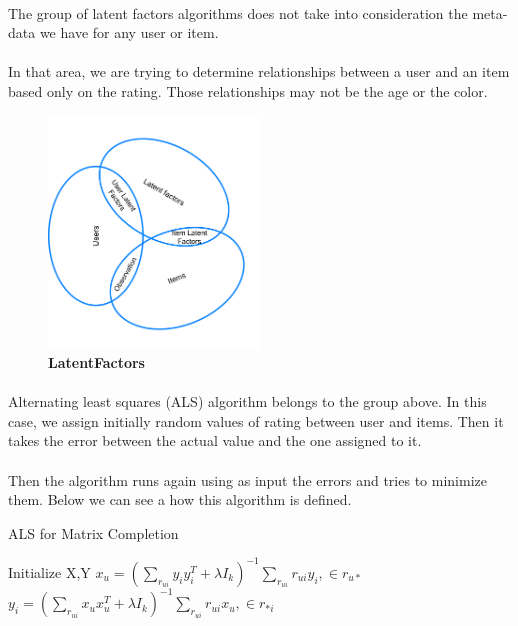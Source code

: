\paragraph{} The group of latent factors algorithms does not take into consideration the meta-data we have for any user or item. 
\paragraph{} In that area, we are trying to determine relationships between a user and an item based only on the rating. Those relationships may not be the age or the color.

\begin{figure}[h]
	\centering
	\includegraphics[width=0.5\textwidth]{../images/LatentFactors.png}
	\caption{\bfseries LatentFactors}
	\label{LatentFactors}
\end{figure}


\paragraph{} Alternating least squares (ALS) algorithm belongs to the group above. In this case, we assign initially random values of rating between user and items. Then it takes the error between the actual value and the one assigned to it. 

\paragraph{}Then the algorithm runs again using as input the errors and tries to minimize them. Below we can see a how this algorithm is defined. \\

\begin{algorithm}
	\caption{ALS for Matrix Completion}\label{ALS}
	\begin{algorithmic}[1]
		\State Initialize X,Y
		\Repeat
		\State $x_{u} = (\sum_{r_{ui}}y_{i}y_{i}^{T} + \lambda I_k)^{-1} \sum_{r_{ui}}r_{ui}y_{i} ,\in r_{u*}$
		\EndFor
		\State $y_{i} = (\sum_{r_{ui}}x_{u}x_{u}^{T} + \lambda I_k)^{-1} \sum_{r_{ui}}r_{ui}x_{u} ,\in r_{*i}$
		\EndFor
	\end{algorithmic}
\end{algorithm}

